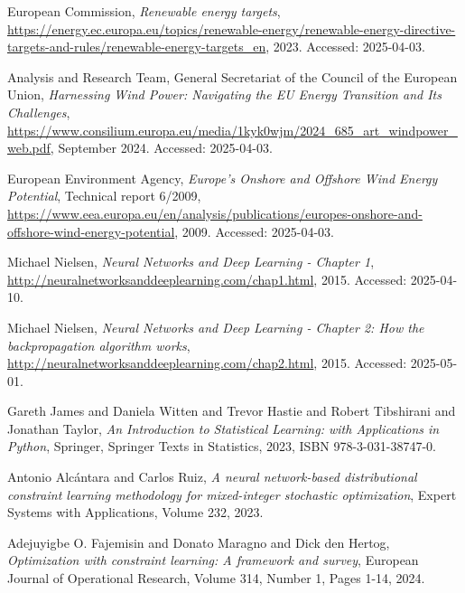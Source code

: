 \documentclass[preprint,12pt]{elsarticle}
\begin{document}
\begin{thebibliography}{00}


European Commission,
\textit{Renewable energy targets},
\url{https://energy.ec.europa.eu/topics/renewable-energy/renewable-energy-directive-targets-and-rules/renewable-energy-targets_en},
2023.
Accessed: 2025-04-03.

Analysis and Research Team, General Secretariat of the Council of the European Union,
\textit{Harnessing Wind Power: Navigating the EU Energy Transition and Its Challenges},
\url{https://www.consilium.europa.eu/media/1kyk0wjm/2024_685_art_windpower_web.pdf},
September 2024.
Accessed: 2025-04-03.

European Environment Agency,
\textit{Europe's Onshore and Offshore Wind Energy Potential},
Technical report 6/2009,
\url{https://www.eea.europa.eu/en/analysis/publications/europes-onshore-and-offshore-wind-energy-potential},
2009.
Accessed: 2025-04-03.

Michael Nielsen,
\textit{Neural Networks and Deep Learning - Chapter 1},
\url{http://neuralnetworksanddeeplearning.com/chap1.html},
2015.
Accessed: 2025-04-10.

Michael Nielsen,
\textit{Neural Networks and Deep Learning - Chapter 2: How the backpropagation algorithm works},
\url{http://neuralnetworksanddeeplearning.com/chap2.html},
2015.
Accessed: 2025-05-01.

Gareth James and Daniela Witten and Trevor Hastie and Robert Tibshirani and Jonathan Taylor,
\textit{An Introduction to Statistical Learning: with Applications in Python},
Springer,
Springer Texts in Statistics,
2023,
ISBN 978-3-031-38747-0.

Antonio Alcántara and Carlos Ruiz,
\textit{A neural network-based distributional constraint learning methodology for mixed-integer stochastic optimization},
Expert Systems with Applications,
Volume 232,
2023.

Adejuyigbe O. Fajemisin and Donato Maragno and Dick den Hertog,
\textit{Optimization with constraint learning: A framework and survey},
European Journal of Operational Research,
Volume 314,
Number 1,
Pages 1-14,
2024.


\end{thebibliography}
\end{document}
